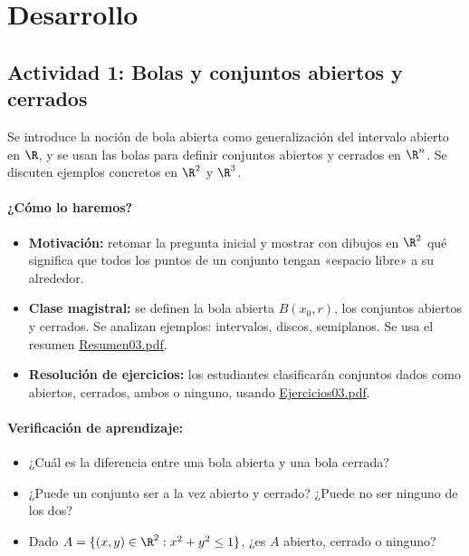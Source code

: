 \documentclass[a4,11pt]{aleph-notas}
\begin{document}
\section*{Desarrollo}

\subsection*{Actividad 1: Bolas y conjuntos abiertos y cerrados}
Se introduce la noción de bola abierta como generalización del intervalo abierto en $\R$, y se usan las bolas para definir conjuntos abiertos y cerrados en $\R^n$. Se discuten ejemplos concretos en $\R^2$ y $\R^3$.

\paragraph{¿Cómo lo haremos?}
\begin{itemize}[leftmargin=*]
    \item \textbf{Motivación:} retomar la pregunta inicial y mostrar con dibujos en $\R^2$ qué significa que todos los puntos de un conjunto tengan «espacio libre» a su alrededor.
    \item \textbf{Clase magistral:} se definen la bola abierta $B(x_0,r)$, los conjuntos abiertos y cerrados. Se analizan ejemplos: intervalos, discos, semiplanos. Se usa el resumen \href{https://andres-merino.github.io/MatematicaIII-05-N0051/01Resumen/Resumen03.pdf}{Resumen03.pdf}.
    \item \textbf{Resolución de ejercicios:} los estudiantes clasificarán conjuntos dados como abiertos, cerrados, ambos o ninguno, usando \href{https://andres-merino.github.io/MatematicaIII-05-N0051/04Ejercicios/Ejercicios03.pdf}{Ejercicios03.pdf}.
\end{itemize}

\paragraph{Verificación de aprendizaje:}
\begin{itemize}[leftmargin=*]
    \item ¿Cuál es la diferencia entre una bola abierta y una bola cerrada?
    \item ¿Puede un conjunto ser a la vez abierto y cerrado? ¿Puede no ser ninguno de los dos?
    \item Dado $A=\{(x,y)\in\R^2: x^2+y^2\leq 1\}$, ¿es $A$ abierto, cerrado o ninguno?
\end{itemize}
\end{document}
